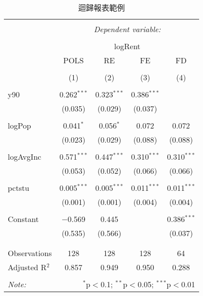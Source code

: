
\begin{table}[!htbp] \centering 
  \caption{迴歸報表範例} 
  \label{tb:regTable} 
\begin{tabular}{@{\extracolsep{5pt}}lcccc} 
\\[-1.8ex]\hline 
\hline \\[-1.8ex] 
 & \multicolumn{4}{c}{\textit{Dependent variable:}} \\ 
\cline{2-5} 
\\[-1.8ex] & \multicolumn{4}{c}{logRent} \\ 
 & POLS & RE & FE & FD \\ 
\\[-1.8ex] & (1) & (2) & (3) & (4)\\ 
\hline \\[-1.8ex] 
 y90 & 0.262$^{***}$ & 0.323$^{***}$ & 0.386$^{***}$ &  \\ 
  & (0.035) & (0.029) & (0.037) &  \\ 
  & & & & \\ 
 logPop & 0.041$^{*}$ & 0.056$^{*}$ & 0.072 & 0.072 \\ 
  & (0.023) & (0.029) & (0.088) & (0.088) \\ 
  & & & & \\ 
 logAvgInc & 0.571$^{***}$ & 0.447$^{***}$ & 0.310$^{***}$ & 0.310$^{***}$ \\ 
  & (0.053) & (0.052) & (0.066) & (0.066) \\ 
  & & & & \\ 
 pctstu & 0.005$^{***}$ & 0.005$^{***}$ & 0.011$^{***}$ & 0.011$^{***}$ \\ 
  & (0.001) & (0.001) & (0.004) & (0.004) \\ 
  & & & & \\ 
 Constant & $-$0.569 & 0.445 &  & 0.386$^{***}$ \\ 
  & (0.535) & (0.566) &  & (0.037) \\ 
  & & & & \\ 
\hline \\[-1.8ex] 
Observations & 128 & 128 & 128 & 64 \\ 
Adjusted R$^{2}$ & 0.857 & 0.949 & 0.950 & 0.288 \\ 
\hline 
\hline \\[-1.8ex] 
\textit{Note:}  & \multicolumn{4}{r}{$^{*}$p$<$0.1; $^{**}$p$<$0.05; $^{***}$p$<$0.01} \\ 
\end{tabular} 
\end{table} 
